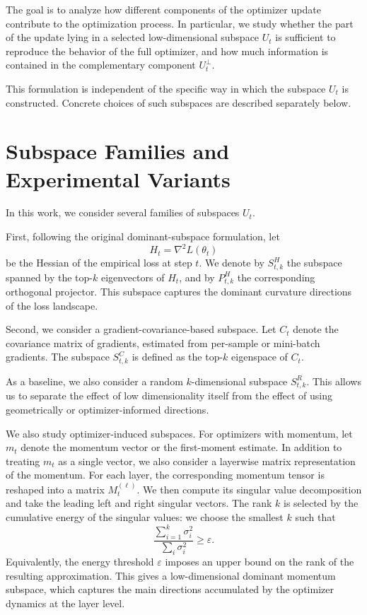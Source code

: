 \documentclass[conference]{IEEEtran}
\begin{document}
The goal is to analyze how different components of the optimizer update contribute to the optimization process. In particular, we study whether the part of the update lying in a selected low-dimensional subspace $U_t$ is sufficient to reproduce the behavior of the full optimizer, and how much information is contained in the complementary component $U_t^\perp$.

This formulation is independent of the specific way in which the subspace $U_t$ is constructed. Concrete choices of such subspaces are described separately below.

\section{Subspace Families and Experimental Variants}

In this work, we consider several families of subspaces $U_t$.

First, following the original dominant-subspace formulation, let
\[
H_t = \nabla^2 L(\theta_t)
\]
be the Hessian of the empirical loss at step $t$. We denote by $S_{t,k}^{H}$ the subspace spanned by the top-$k$ eigenvectors of $H_t$, and by $P_{t,k}^{H}$ the corresponding orthogonal projector. This subspace captures the dominant curvature directions of the loss landscape.

Second, we consider a gradient-covariance-based subspace. Let $C_t$ denote the covariance matrix of gradients, estimated from per-sample or mini-batch gradients. The subspace $S_{t,k}^{C}$ is defined as the top-$k$ eigenspace of $C_t$.

As a baseline, we also consider a random $k$-dimensional subspace $S_{t,k}^{R}$. This allows us to separate the effect of low dimensionality itself from the effect of using geometrically or optimizer-informed directions.

We also study optimizer-induced subspaces. For optimizers with momentum, let \(m_t\) denote the momentum vector or the first-moment estimate. 
In addition to treating \(m_t\) as a single vector, we also consider a layerwise matrix representation of the momentum. 
For each layer, the corresponding momentum tensor is reshaped into a matrix \(M_t^{(\ell)}\). 
We then compute its singular value decomposition and take the leading left and right singular vectors. 
The rank \(k\) is selected by the cumulative energy of the singular values: we choose the smallest \(k\) such that
\[
\frac{\sum_{i=1}^{k} \sigma_i^2}{\sum_{i} \sigma_i^2} \geq \varepsilon .
\]
Equivalently, the energy threshold \(\varepsilon\) imposes an upper bound on the rank of the resulting approximation. 
This gives a low-dimensional dominant momentum subspace, which captures the main directions accumulated by the optimizer dynamics at the layer level.
\end{document}
